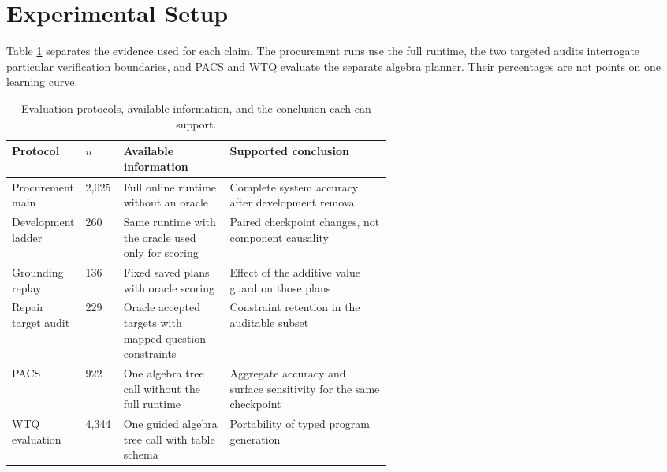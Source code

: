 \section{Experimental Setup}
\label{sec:experiments}

Table \ref{tab:protocols} separates the evidence used for each claim.  The procurement runs use the
full runtime, the two targeted audits interrogate particular verification boundaries, and PACS and
WTQ evaluate the separate algebra planner.  Their percentages are not points on one learning
curve.

\begin{table}[t]
  \centering
  \caption{Evaluation protocols, available information, and the conclusion each can support.}
  \label{tab:protocols}
  \small
  \begin{tabularx}{\linewidth}{p{0.17\linewidth}p{0.10\linewidth}p{0.29\linewidth}X}
    \toprule
    Protocol & $n$ & Available information & Supported conclusion \\
    \midrule
    Procurement main & 2,025 & Full online runtime without an oracle & Complete system accuracy after development removal \\
    Development ladder & 260 & Same runtime with the oracle used only for scoring & Paired checkpoint changes, not component causality \\
    Grounding replay & 136 & Fixed saved plans with oracle scoring & Effect of the additive value guard on those plans \\
    Repair target audit & 229 & Oracle accepted targets with mapped question constraints & Constraint retention in the auditable subset \\
    PACS & 922 & One algebra tree call without the full runtime & Aggregate accuracy and surface sensitivity for the same checkpoint \\
    WTQ evaluation & 4,344 & One guided algebra tree call with table schema & Portability of typed program generation \\
    \bottomrule
  \end{tabularx}
\end{table}

